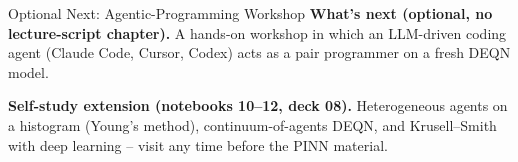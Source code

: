 \documentclass[aspectratio=169,11pt]{beamer}
\begin{document}
\begin{frame}{Optional Next: Agentic-Programming Workshop}
\footnotesize
\textbf{What's next (optional, no lecture-script chapter).}  A hands-on workshop in which an LLM-driven coding agent (Claude Code, Cursor, Codex) acts as a pair programmer on a fresh DEQN model.

\vspace{0.4em}
\textbf{Self-study extension (notebooks 10--12, deck 08).}  Heterogeneous agents on a histogram (Young's method), continuum-of-agents DEQN, and Krusell--Smith with deep learning -- visit any time before the PINN material.
\end{frame}
\end{document}
